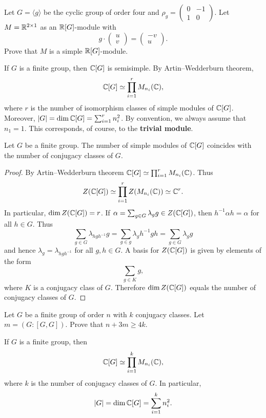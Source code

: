 \begin{exercise}
Let $G=\langle g\rangle$ be the cyclic group 
of order four and $\rho_g=\begin{pmatrix}
0&-1\\
1&0\end{pmatrix}$. 
Let $M=\mathbb{R}^{2\times 1}$ as an $\mathbb{R}[G]$-module with 
\[
g\cdot\begin{pmatrix}u\\v\end{pmatrix}
=\begin{pmatrix}-v\\u\end{pmatrix}.
\]
Prove that $M$ is a simple $\mathbb{R}[G]$-module. 
\end{exercise}

If $G$ is a finite group, 
then $\mathbb{C}[G]$ is semisimple. By Artin--Wedderburn theorem, 
\[
\mathbb{C}[G]\simeq\prod_{i=1}^r M_{n_i}(\mathbb{C}),
\]
where $r$ is the number of isomorphism classes of simple modules of $\mathbb{C}[G]$. Moreover, 
$|G|=\dim\mathbb{C}[G]=\sum_{i=1}^r n_i^2$. By convention, 
we always assume that $n_1=1$. 
This corresponds, of course, to the \textbf{trivial module}. 

\begin{theorem}
    Let $G$ be a finite group. The number of simple 
    modules of $\mathbb{C}[G]$ coincides with the number of conjugacy classes of $G$. 
\end{theorem}

\begin{proof}
    By Artin--Wedderburn theorem $\mathbb{C}[G]\simeq\prod_{i=1}^rM_{n_i}(\mathbb{C})$. Thus 
    \[
		Z(\mathbb{C}[G])\simeq\prod_{i=1}^rZ(M_{n_i}(\mathbb{C}))\simeq\mathbb{C}^r.
	\]
	In particular, $\dim Z(\mathbb{C}[G])=r$. If $\alpha=\sum_{g\in
	G}\lambda_gg\in Z(\mathbb{C}[G])$, then $h^{-1}\alpha h=\alpha$ for all $h\in
	G$. Thus 
	\[
		\sum_{g\in G}\lambda_{hgh^{-1}}g=
		\sum_{g\in g}\lambda_g h^{-1}gh=\sum_{g\in G}\lambda_gg
	\]
	and hence $\lambda_{g}=\lambda_{hgh^{-1}}$ for all $g,h\in G$. A basis for 
	$Z(\mathbb{C}[G])$ is given by elements of the form 
	\[
		\sum_{g\in K}g,
	\]
	where $K$ is a conjugacy class of $G$. Therefore $\dim Z(\mathbb{C}[G])$ equals 
	the number of conjugacy classes of $G$.
\end{proof}

\begin{exercise}
    Let $G$ be a finite group of order $n$ with $k$ conjugacy classes.
    Let $m=(G:[G,G])$. Prove that $n+3m\geq4k$. 
\end{exercise}

If $G$ is a finite group,
then 
\[
\mathbb{C}[G]\simeq \prod_{i=1}^k M_{n_i}(\mathbb{C}),
\]
where $k$ is the number of conjugacy classes of $G$. 
In particular, 
\[
|G|=\dim\mathbb{C}[G]=\sum_{i=1}^k n_i^2.
\]


